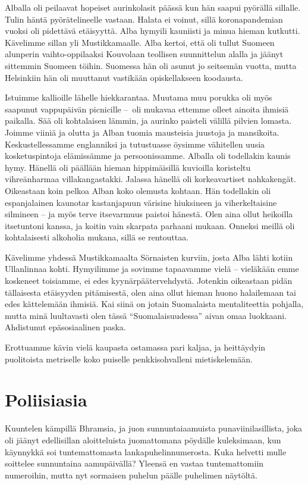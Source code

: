 \documentclass{tsnovel}
\begin{document}
Alballa oli peilaavat hopeiset aurinkolasit päässä kun hän saapui pyörällä sillalle. Tulin häntä pyörätelineelle vastaan. Halata ei voinut, sillä koronapandemian vuoksi oli pidettävä etäisyyttä. Alba hymyili kauniisti ja minua hieman kutkutti. Kävelimme sillan yli Mustikkamaalle. Alba kertoi, että oli tullut Suomeen alunperin vaihto-oppilaaksi Kouvolaan teollisen suunnittelun alalla ja jäänyt sittemmin Suomeen töihin. Suomessa hän oli asunut jo seitsemän vuotta, mutta Helsinkiin hän oli muuttanut vastikään opiskellakseen koodausta.

Istuimme kallioille lähelle hiekkarantaa. Muutama muu porukka oli myös saapunut vappupäivän picnicille – oli mukavaa ettemme olleet ainoita ihmisiä paikalla. Sää oli kohtalaisen lämmin, ja aurinko paisteli välillä pilvien lomasta. Joimme viiniä ja olutta ja Alban tuomia mausteisia juustoja ja mansikoita. Keskustellessamme englanniksi ja tutustuasse öysimme vähitellen uusia kosketuspintoja elämissämme ja persoonissamme. Alballa oli todellakin kaunis hymy. Hänellä oli päällään hieman hippimäisillä kuvioilla koristeltu vihreänharmaa villakangastakki. Jalassa hänellä oli korkeavartiset nahkakengät. Oikeastaan koin  pelkoa Alban koko olemusta kohtaan. Hän todellakin oli espanjalainen kaunotar kastanjapuun värisine hiuksineen ja viherkeltaisine silmineen – ja myös terve itsevarmuus paistoi hänestä. Olen aina ollut heikoilla itsetuntoni kanssa, ja koitin vain skarpata parhaani mukaan. Onneksi meillä oli kohtalaisesti alkoholia mukana, sillä se rentouttaa. 

Kävelimme yhdessä Mustikkamaalta Sörnaisten kurviin, josta Alba lähti kotiin Ullanlinnaa kohti. Hymyilimme ja sovimme tapaavamme vielä – vieläkään emme koskeneet toisiamme, ei edes kyynärpäätervehdystä. Jotenkin oikeastaan pidän tällaisesta etäisyyden pitämisestä, olen aina ollut hieman huono halailemaan tai edes kättelemään ihmisiä. Kai siinä on jotain Suomalaista mentaliteettia pohjalla, mutta minä luultavasti olen tässä ``Suomalaisuudessa'' aivan omaa luokkaani. Ahdistunut epäsosiaalinen paska.

Erottuamme kävin vielä kaupasta ostamassa pari kaljaa, ja heittäydyin puolitoista metriselle koko puiselle penkkisohvalleni mietiskelemään.


\section{Poliisiasia}
Kuuntelen kämpillä Bhramsia, ja juon sunnuntaiaamuista punaviinilasillista, joka oli jäänyt edellisillan aloitteluista juomattomana pöydälle kuleksimaan, kun käynnykkä soi tuntemattomasta lankapuhelinnumerosta. Kuka helvetti mulle soittelee sunnuntaina aamupäivällä? Yleensä en vastaa tuntemattomiin numeroihin, mutta nyt sormaisen puhelun päälle puhelimen näytöltä.
\end{document}
